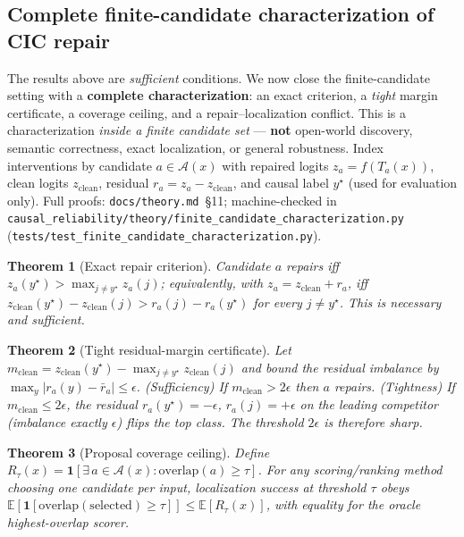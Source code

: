\documentclass[11pt]{article}
\newtheorem{theorem}{Theorem}
\begin{document}
\subsection{Complete finite-candidate characterization of CIC repair}
\label{sec:finitechar}
The results above are \emph{sufficient} conditions. We now close the finite-candidate
setting with a \textbf{complete characterization}: an exact criterion, a \emph{tight}
margin certificate, a coverage ceiling, and a repair--localization conflict. This is a
characterization \emph{inside a finite candidate set} --- \textbf{not} open-world
discovery, semantic correctness, exact localization, or general robustness. Index
interventions by candidate $a\in\mathcal{A}(x)$ with repaired logits $z_a=f(T_a(x))$,
clean logits $z_{\mathrm{clean}}$, residual $r_a=z_a-z_{\mathrm{clean}}$, and causal
label $y^\star$ (used for evaluation only). Full proofs:
\texttt{docs/theory.md}~\S11; machine-checked in
\texttt{causal\_reliability/theory/finite\_candidate\_characterization.py}
(\texttt{tests/test\_finite\_candidate\_characterization.py}).

\begin{theorem}[Exact repair criterion]
Candidate $a$ repairs iff $z_a(y^\star) > \max_{j\neq y^\star} z_a(j)$; equivalently,
with $z_a=z_{\mathrm{clean}}+r_a$, iff $z_{\mathrm{clean}}(y^\star)-z_{\mathrm{clean}}(j)
> r_a(j)-r_a(y^\star)$ for every $j\neq y^\star$. This is necessary and sufficient.
\end{theorem}

\begin{theorem}[Tight residual-margin certificate]
Let $m_{\mathrm{clean}}=z_{\mathrm{clean}}(y^\star)-\max_{j\neq y^\star}z_{\mathrm{clean}}(j)$
and bound the residual imbalance by $\max_y|r_a(y)-\bar r_a|\le\epsilon$. \emph{(Sufficiency)}
If $m_{\mathrm{clean}}>2\epsilon$ then $a$ repairs. \emph{(Tightness)} If
$m_{\mathrm{clean}}\le 2\epsilon$, the residual $r_a(y^\star)=-\epsilon$, $r_a(j)=+\epsilon$
on the leading competitor (imbalance exactly $\epsilon$) flips the top class. The
threshold $2\epsilon$ is therefore sharp.
\end{theorem}

\begin{theorem}[Proposal coverage ceiling]
Define $R_\tau(x)=\mathbf{1}[\exists\,a\in\mathcal{A}(x):\mathrm{overlap}(a)\ge\tau]$.
For \emph{any} scoring/ranking method choosing one candidate per input, localization
success at threshold $\tau$ obeys
$\mathbb{E}[\mathbf{1}[\mathrm{overlap}(\mathrm{selected})\ge\tau]]\le\mathbb{E}[R_\tau(x)]$,
with equality for the oracle highest-overlap scorer.
\end{theorem}
\end{document}
